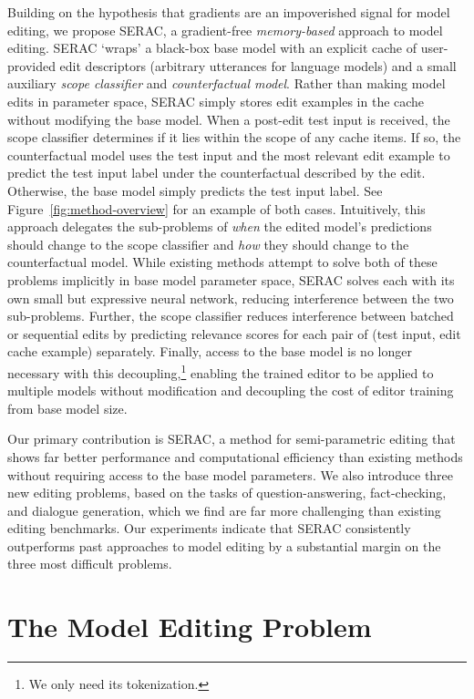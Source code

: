 \documentclass{article}
\newcommand{\name}{SERAC}
\begin{document}
Building on the hypothesis that gradients are an impoverished signal for model editing, we propose {\name}, a gradient-free \textit{memory-based} approach to model editing. {\name} `wraps' a black-box base model with an explicit cache of user-provided edit descriptors (arbitrary utterances for language models) and a small auxiliary \textit{scope classifier} and \textit{counterfactual model}. Rather than making model edits in parameter space, {\name} simply stores edit examples in the cache without modifying the base model. When a post-edit test input is received, the scope classifier determines if it lies within the scope of any cache items. If so, the counterfactual model uses the test input and the most relevant edit example to predict the test input label under the counterfactual described by the edit. Otherwise, the base model simply predicts the test input label. See Figure~\ref{fig:method-overview} for an example of both cases. Intuitively, this approach delegates the sub-problems of \textit{when} the edited model's predictions should change to the scope classifier and \textit{how} they should change to the counterfactual model. While existing methods attempt to solve both of these problems implicitly in base model parameter space, {\name} solves each with its own small but expressive neural network, reducing interference between the two sub-problems. Further, the scope classifier reduces interference between batched or sequential edits by predicting relevance scores for each pair of (test input, edit cache example) separately. Finally, access to the base model is no longer necessary with this decoupling,\footnote{We only need its tokenization.} enabling the trained editor to be applied to multiple models without modification and decoupling the cost of editor training from base model size.

Our primary contribution is {\name}, a method for semi-parametric editing that shows far better performance and computational efficiency than existing methods without requiring access to the base model parameters. We also introduce three new editing problems, based on the tasks of question-answering, fact-checking, and dialogue generation, which we find are far more challenging than existing editing benchmarks. Our experiments indicate that {\name} consistently outperforms past approaches to model editing by a substantial margin on the three most difficult problems.

\section{The Model Editing Problem}
\end{document}

